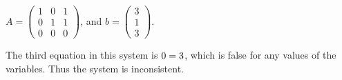 \documentclass{ximera}
\begin{document}
\begin{exercise}
\item $A = \begin{pmatrix}1 & 0 & 1\\ 0 & 1 & 1 \\ 0 & 0 & 0\end{pmatrix}$, 
and $b = \begin{pmatrix}3 \\ 1 \\ 3\end{pmatrix}$. 

\begin{multipleChoice}
\end{multipleChoice}

\begin{problem}
The third equation in this system is ${0} = 3$, which is false for any values of the variables.  Thus the system is inconsistent.  
\end{problem}
\end{exercise}
\end{document}
